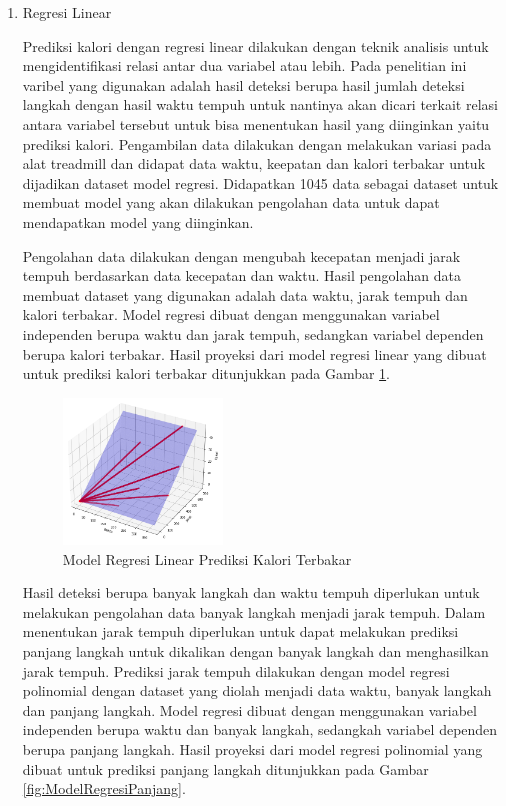 \begin{enumerate}
  \item Regresi Linear
  
  Prediksi kalori dengan regresi linear dilakukan dengan teknik analisis untuk mengidentifikasi relasi antar dua variabel atau lebih. Pada penelitian ini varibel yang digunakan adalah hasil deteksi berupa hasil jumlah deteksi langkah dengan hasil waktu tempuh untuk nantinya akan dicari terkait relasi antara variabel tersebut untuk bisa menentukan hasil yang diinginkan yaitu prediksi kalori. Pengambilan data dilakukan dengan melakukan variasi pada alat treadmill dan didapat data waktu, keepatan dan kalori terbakar untuk dijadikan dataset model regresi. Didapatkan 1045 data sebagai dataset untuk membuat model yang akan dilakukan pengolahan data untuk dapat mendapatkan model yang diinginkan.

  Pengolahan data dilakukan dengan mengubah kecepatan menjadi jarak tempuh berdasarkan data kecepatan dan waktu. Hasil pengolahan data membuat dataset yang digunakan adalah data waktu, jarak tempuh dan kalori terbakar. Model regresi dibuat dengan menggunakan variabel independen berupa waktu dan jarak tempuh, sedangkan variabel dependen berupa kalori terbakar. Hasil proyeksi dari model regresi linear yang dibuat untuk prediksi kalori terbakar ditunjukkan pada Gambar \ref{fig:ModelRegresiKalori}.

  \begin{figure} [ht]
    \centering
    \includegraphics[width=0.4\textwidth]{gambar/model regresi kalori3.png}
    \caption{Model Regresi Linear Prediksi Kalori Terbakar}
    \label{fig:ModelRegresiKalori}
  \end{figure}

  Hasil deteksi berupa banyak langkah dan waktu tempuh diperlukan untuk melakukan pengolahan data banyak langkah menjadi jarak tempuh. Dalam menentukan jarak tempuh diperlukan untuk dapat melakukan prediksi panjang langkah untuk dikalikan dengan banyak langkah dan menghasilkan jarak tempuh. Prediksi jarak tempuh dilakukan dengan model regresi polinomial dengan dataset yang diolah menjadi data waktu, banyak langkah dan panjang langkah. Model regresi dibuat dengan menggunakan variabel independen berupa waktu dan banyak langkah, sedangkah variabel dependen berupa panjang langkah. Hasil proyeksi dari model regresi polinomial yang dibuat untuk prediksi panjang langkah ditunjukkan pada Gambar \ref{fig:ModelRegresiPanjang}.


\end{enumerate}
